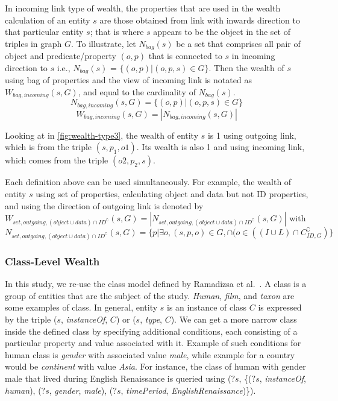In incoming link type of wealth, the properties that are used in the wealth calculation of an entity \(s\) are those obtained from link with inwards direction to that particular entity \(s\); that is where \(s\) appears to be the object in the set of triples in graph \(G\). To illustrate, let \(N_{bag}(s)\) be a set that comprises all pair of object and predicate/property \((o,p)\) that is connected to \(s\) in incoming direction to \(s\) i.e., \(N_{bag}(s)\) = \(\{(o, p) | (o, p, s) \in G\}\). Then the wealth of \(s\) using bag of properties and the view of incoming link is notated as \(W_{bag, incoming}(s, G)\), and equal to the cardinality of \(N_{bag}(s)\).
\[
    N_{bag, incoming}(s, G) = \{(o,p) | (o, p, s) \in G\}
\]
\[
    W_{bag, incoming}(s, G) = |N_{bag, incoming}(s, G)|
\]

Looking at in \autoref{fig:wealth-type3}, the wealth of entity \(s\) is 1 using outgoing link, which is from the triple \((s, p_1, o1)\). Its wealth is also 1 and using incoming link, which comes from the triple \((o2, p_2, s)\).

Each definition above can be used simultaneously. For example, the wealth of entity \(s\) using set of properties, calculating object and data but not ID properties, and using the direction of outgoing link is denoted by \(W_{set, outgoing, (object \cup data) \cap ID^\complement}(s, G) = |N_{set, outgoing, (object \cup data) \cap ID^\complement}(s, G)|\) with \(N_{set, outgoing, (object \cup data) \cap ID^\complement}(s, G) = \{p | \exists o, (s, p, o) \in G, \cap (o \in ((I \cup L) \cap C_{ID,G}^\complement)\}\)

\subsubsection{Class-Level Wealth}
In this study, we re-use the class model defined by Ramadizsa et al.~\cite{RamadizsaDNR23}. A class is a group of entities that are the subject of the study. \textit{Human}, \textit{film}, and \textit{taxon} are some examples of class. In general, entity \(s\) is an instance of class \(C\) is expressed by the triple (\(s\), \textit{instanceOf}, \(C\)) or (\(s\), \textit{type}, \(C\)). We can get a more narrow class inside the defined class by specifying additional conditions, each consisting of a particular property and value associated with it. Example of such conditions for human class is \textit{gender} with associated value \textit{male}, while example for a country would be \textit{continent} with value \textit{Asia}. For instance, the class of human with gender male that lived during English Renaissance is queried using (\(?s\), \{(\(?s\), \textit{instanceOf}, \textit{human}), (\(?s\), \textit{gender}, \textit{male}), (\(?s\), \textit{timePeriod}, \textit{EnglishRenaissance})\}).

